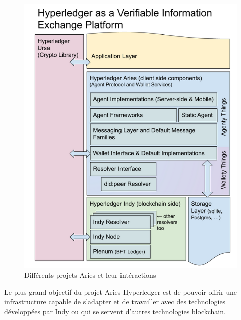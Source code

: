 \documentclass[12pt, openany]{report}
\begin{document}
\begin{flushleft}
\begin{itemize}
\end{itemize}
\begin{figure}[h]
\includegraphics[scale=0.4]{aries-hyper.png}
\centering
\caption{Différents projets Aries et leur intéractions}
\end{figure}

\vspace{5mm}
Le plus grand objectif du projet Aries Hyperledger est de pouvoir offrir une infrastructure capable de s'adapter et de travailler avec des technologies développées par Indy ou qui se servent d'autres technologies blockchain. 
\end{flushleft}

\newpage
\end{document}
